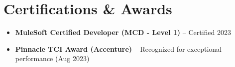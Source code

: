 \documentclass[letterpaper,10pt]{article}
\begin{document}
\section*{Certifications \& Awards}
\begin{itemize} \itemsep -2pt
    \item \textbf{MuleSoft Certified Developer (MCD - Level 1)} -- Certified 2023
    \item \textbf{Pinnacle TCI Award (Accenture)} -- Recognized for exceptional performance (Aug 2023)
\end{itemize}
\end{document}
